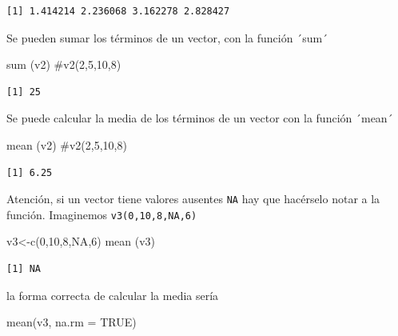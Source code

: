 \documentclass[
  letterpaper,
  DIV=11,
  numbers=noendperiod]{scrreprt}
\newenvironment{Shaded}{\begin{snugshade}}{\end{snugshade}}
\newcommand{\AttributeTok}[1]{\textcolor[rgb]{0.40,0.45,0.13}{#1}}
\newcommand{\CommentTok}[1]{\textcolor[rgb]{0.37,0.37,0.37}{#1}}
\newcommand{\ConstantTok}[1]{\textcolor[rgb]{0.56,0.35,0.01}{#1}}
\newcommand{\DecValTok}[1]{\textcolor[rgb]{0.68,0.00,0.00}{#1}}
\newcommand{\FunctionTok}[1]{\textcolor[rgb]{0.28,0.35,0.67}{#1}}
\newcommand{\NormalTok}[1]{\textcolor[rgb]{0.00,0.23,0.31}{#1}}
\newcommand{\OtherTok}[1]{\textcolor[rgb]{0.00,0.23,0.31}{#1}}
\begin{document}
\begin{verbatim}
[1] 1.414214 2.236068 3.162278 2.828427
\end{verbatim}

Se pueden sumar los términos de un vector, con la función ´sum´

\begin{Shaded}
\begin{Highlighting}[]
\FunctionTok{sum}\NormalTok{ (v2) }\CommentTok{\#v2(2,5,10,8) }
\end{Highlighting}
\end{Shaded}

\begin{verbatim}
[1] 25
\end{verbatim}

Se puede calcular la media de los términos de un vector con la función
´mean´

\begin{Shaded}
\begin{Highlighting}[]
\FunctionTok{mean}\NormalTok{ (v2) }\CommentTok{\#v2(2,5,10,8)}
\end{Highlighting}
\end{Shaded}

\begin{verbatim}
[1] 6.25
\end{verbatim}

Atención, si un vector tiene valores ausentes \texttt{NA} hay que
hacérselo notar a la función. Imaginemos \texttt{v3(0,10,8,NA,6)}

\begin{Shaded}
\begin{Highlighting}[]
\NormalTok{v3}\OtherTok{\textless{}{-}}\FunctionTok{c}\NormalTok{(}\DecValTok{0}\NormalTok{,}\DecValTok{10}\NormalTok{,}\DecValTok{8}\NormalTok{,}\ConstantTok{NA}\NormalTok{,}\DecValTok{6}\NormalTok{)}
\FunctionTok{mean}\NormalTok{ (v3)}
\end{Highlighting}
\end{Shaded}

\begin{verbatim}
[1] NA
\end{verbatim}

la forma correcta de calcular la media sería

\begin{Shaded}
\begin{Highlighting}[]
\FunctionTok{mean}\NormalTok{(v3, }\AttributeTok{na.rm =} \ConstantTok{TRUE}\NormalTok{)}
\end{Highlighting}
\end{Shaded}
\end{document}
